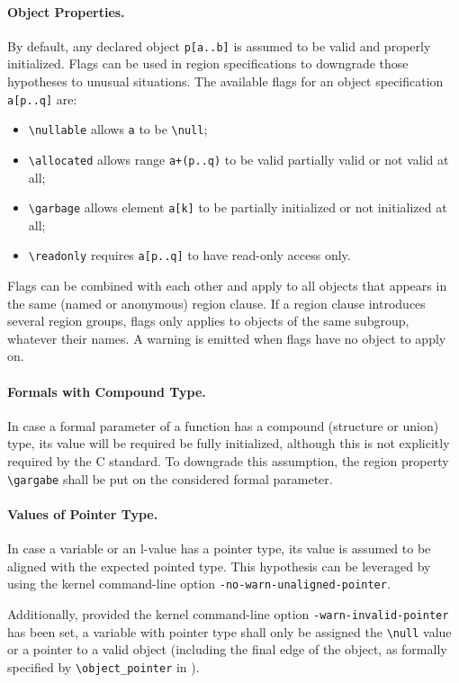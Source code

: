 \paragraph{Object Properties.}
By default, any declared object \verb+p[a..b]+ is assumed to be valid and
properly initialized. Flags can be used in region specifications to downgrade
those hypotheses to unusual situations. The available flags for an
object specification \verb+a[p..q]+ are:
\begin{itemize}
  \item \verb+\nullable+ allows \verb+a+ to be \verb+\null+;
  \item \verb+\allocated+ allows range \verb$a+(p..q)$ to be valid partially
  valid or not valid at all;
  \item \verb+\garbage+ allows element \verb+a[k]+ to be partially initialized
  or not initialized at all;
  \item \verb+\readonly+ requires \verb+a[p..q]+ to have read-only access only.
\end{itemize}
Flags can be combined with each other and apply to all objects that appears in
the same (named or anonymous) region clause. If a region clause introduces
several region groups, flags only applies to objects of the same subgroup,
whatever their names. A warning is emitted when flags have no object to apply on.

\paragraph{Formals with Compound Type.}
In case a formal parameter of a function has a compound (structure or union)
type, its value will be required be fully initialized, although this is not
explicitly required by the C standard. To downgrade this assumption, the region
property \verb+\gargabe+ shall be put on the considered formal parameter.

\paragraph{Values of Pointer Type.}
In case a variable or an l-value has a pointer type, its value is assumed to be
aligned with the expected pointed type. This hypothesis can be leveraged by
using the kernel command-line option \verb+-no-warn-unaligned-pointer+.

\noindent Additionally, provided the kernel command-line option
\verb+-warn-invalid-pointer+ has been set, a variable with pointer type shall
only be assigned the \verb+\null+ value or a pointer to a valid object
(including the final edge of the object, as formally specified by
\verb+\object_pointer+ in \acsl).

